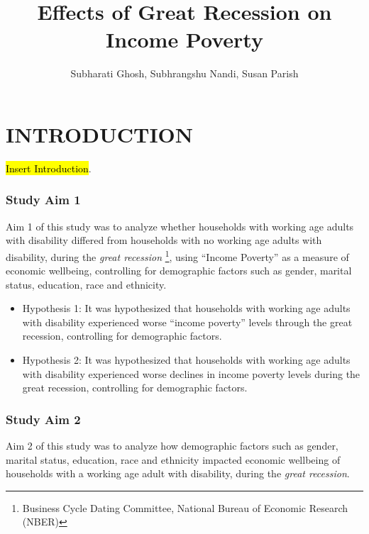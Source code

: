 \documentclass[11pt]{extarticle} %
\begin{document}
\doublespacing


\title{Effects of Great Recession on Income Poverty}
\author{Subharati Ghosh, Subhrangshu Nandi, Susan Parish \\
\date{}
}

\maketitle
\section*{INTRODUCTION}
\noindent
{\hl{Insert Introduction}}.

\subsubsection*{Study Aim 1}
Aim 1 of this study was to analyze whether households with working age adults with disability differed from households with no working age adults with disability, during the {\emph{great recession}} \footnote{Business Cycle Dating Committee, National Bureau of Economic Research (NBER)}, using ``Income Poverty'' as a measure of economic wellbeing, controlling for demographic factors such as gender, marital status, education, race and ethnicity. 
\begin{itemize}
\item Hypothesis 1: It was hypothesized that households with working age adults with disability experienced worse ``income poverty'' levels through the great recession, controlling for demographic factors.
\item Hypothesis 2: It was hypothesized that households with working age adults with disability experienced worse declines in income poverty levels during the great recession, controlling for demographic factors.
\end{itemize}

\subsubsection*{Study Aim 2}
Aim 2 of this study was to analyze how demographic factors such as gender, marital status, education, race and ethnicity impacted economic wellbeing of households with a working age adult with disability, during the {\emph{great recession}}. 
\end{document}
